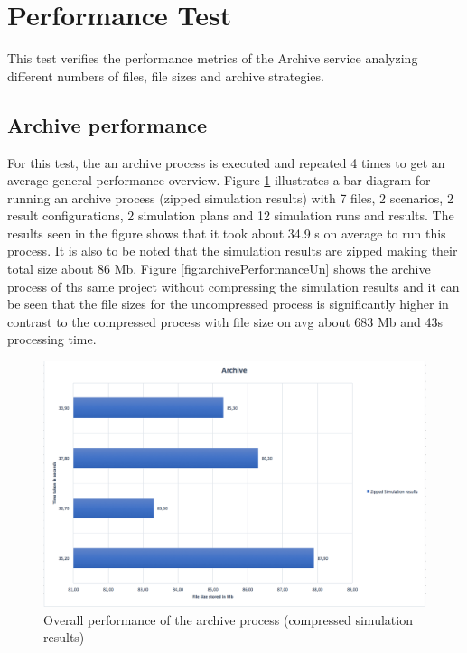 \section{Performance Test}
This test verifies the performance metrics of the Archive service analyzing different numbers of files, file sizes and archive strategies.

\subsection{Archive performance}
For this test, the an archive process is executed and repeated 4 times to get an average general performance overview. Figure \ref{fig:archivePerformance} illustrates a bar diagram for running an archive process (zipped simulation results) with 7 files, 2 scenarios, 2 result configurations, 2 simulation plans
and 12 simulation runs and results. The results seen in the figure shows that it took about 34.9 s on average to run this process. It is also to be noted that the
simulation results are zipped making their total size about 86 Mb. Figure \ref{fig:archivePerformanceUn} shows the archive process of ths same project without 
compressing the simulation results and it can be seen that the file sizes for the uncompressed process is significantly higher in contrast to the compressed
process with file size on avg about 683 Mb and 43s processing time.

\begin{figure}[H]
    \centering \includegraphics[scale=0.5]{grafiken/archiveZip.png}
    \caption{Overall performance of the archive process (compressed simulation results)}
    \label{fig:archivePerformance}
\end{figure}

